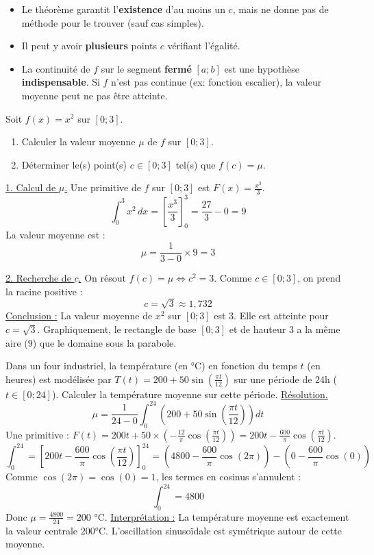 \documentclass[11pt]{article}
\begin{document}
\begin{attention}
\begin{itemize}
    \item Le théorème garantit l'\textbf{existence} d'au moins un $c$, mais ne donne pas de méthode pour le trouver (sauf cas simples).
    \item Il peut y avoir \textbf{plusieurs} points $c$ vérifiant l'égalité.
    \item La continuité de $f$ sur le segment \textbf{fermé} $[a;b]$ est une hypothèse \textbf{indispensable}. Si $f$ n'est pas continue (ex: fonction escalier), la valeur moyenne peut ne pas être atteinte.
\end{itemize}
\end{attention}

\begin{exoresolu}[{Valeur moyenne et point $c$ pour $f(x)=x^2$ sur $[0;3]$}]
Soit $f(x)=x^2$ sur $[0;3]$.
\begin{enumerate}
    \item Calculer la valeur moyenne $\mu$ de $f$ sur $[0;3]$.
    \item Déterminer le(s) point(s) $c \in [0;3]$ tel(s) que $f(c)=\mu$.
\end{enumerate}
\tcblower
\underline{1. Calcul de $\mu$.}
Une primitive de $f$ sur $[0;3]$ est $F(x)=\frac{x^3}{3}$.
\[
\int_0^3 x^2\,dx = \left[\frac{x^3}{3}\right]_0^3 = \frac{27}{3} - 0 = 9
\]
La valeur moyenne est :
\[
\mu = \frac{1}{3-0} \times 9 = 3
\]

\underline{2. Recherche de $c$.}
On résout $f(c) = \mu \iff c^2 = 3$.
Comme $c \in [0;3]$, on prend la racine positive :
\[
c = \sqrt{3} \approx 1,732
\]
\underline{Conclusion :} La valeur moyenne de $x^2$ sur $[0;3]$ est $3$. Elle est atteinte pour $c=\sqrt{3}$. Graphiquement, le rectangle de base $[0;3]$ et de hauteur $3$ a la même aire ($9$) que le domaine sous la parabole.

\end{exoresolu}

\begin{exoresolu}
Dans un four industriel, la température (en °C) en fonction du temps $t$ (en heures) est modélisée par $T(t) = 200 + 50\sin\left(\frac{\pi t}{12}\right)$ sur une période de 24h ($t \in [0;24]$). Calculer la température moyenne sur cette période.
\tcblower
\underline{Résolution.}
\[
\mu = \frac{1}{24-0}\int_0^{24} \left(200 + 50\sin\left(\frac{\pi t}{12}\right)\right)dt
\]
Une primitive : $F(t) = 200t + 50 \times \left(-\frac{12}{\pi}\cos\left(\frac{\pi t}{12}\right)\right) = 200t - \frac{600}{\pi}\cos\left(\frac{\pi t}{12}\right)$.
\[
\int_0^{24} = \left[200t - \frac{600}{\pi}\cos\left(\frac{\pi t}{12}\right)\right]_0^{24}
= \left(4800 - \frac{600}{\pi}\cos(2\pi)\right) - \left(0 - \frac{600}{\pi}\cos(0)\right)
\]
Comme $\cos(2\pi)=\cos(0)=1$, les termes en cosinus s'annulent :
\[
\int_0^{24} = 4800
\]
Donc $\mu = \frac{4800}{24} = 200$ °C.
\underline{Interprétation :} La température moyenne est exactement la valeur centrale $200$°C. L'oscillation sinusoïdale est symétrique autour de cette moyenne.

\end{exoresolu}
\end{document}
